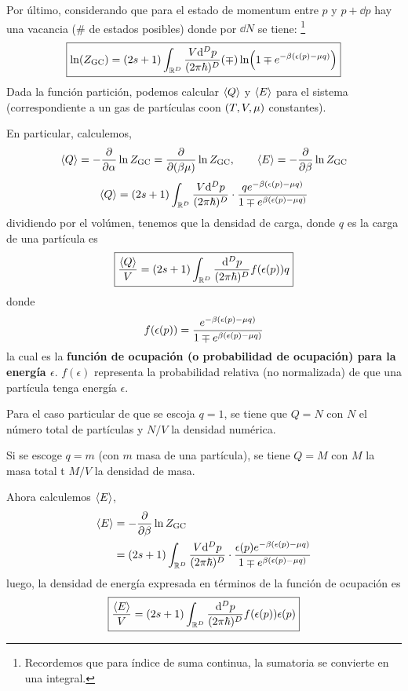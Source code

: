 Por último, considerando que para el estado de momentum entre $p$ y $p+\dd p$ hay una vacancia (\# de estados posibles) donde por $\dd N$ se tiene: \footnote{Recordemos que para índice de suma continua, la sumatoria se convierte en una integral.}
\begin{equation}
 \boxed{ \ln(Z_{\rm GC})=(2s+1)\int_{\mathbb{R}^D}\frac{V\dd^Dp}{(2\pi\hbar)^D}(\mp)\ln(1\mp e^{-\beta (\epsilon(p)-\mu q)})}
\end{equation}
Dada la función partición, podemos calcular $\ev{Q}$ y $\ev{E}$ para el sistema (correspondiente a un gas de partículas coon $(T,V,\mu )$ constantes).

En particular, calculemos,
\begin{equation}
  \ev{Q}=-\pdv{\a }\ln\zgc=\pdv{(\b\m )}\ln\zgc,\qquad \ev{E}=-\pdv{\b}\ln\zgc
\end{equation}
\begin{equation}
  \ev{Q}=(2s+1)\int_{\mathbb{R}^D}\frac{V\dd^Dp}{(2\p\hbar)^D}\cdot \frac{qe^{-\b (\epsilon(p)-\m q)}}{1\mp e^{\b (\epsilon(p)-\m q)}}
\end{equation}
dividiendo por el volúmen, tenemos que la densidad de carga, donde $q$ es la carga de una partícula es
\begin{equation}\label{8.densidadnumerica}
 \boxed{ \frac{\ev{Q}}{V}=(2s+1)\int_{\mathbb{R}^D}\frac{\dd^Dp}{(2\p\hbar)^D}f(\epsilon(p))q}
\end{equation}
donde
\begin{equation}
  f(\epsilon(p))=\frac{e^{-\beta (\epsilon(p)-\mu q)}}{1\mp e^{\beta (\epsilon(p)-\mu q)}}
\end{equation}
la cual es la \textbf{función de ocupación (o probabilidad de ocupación) para la energía $\epsilon$}. $f(\epsilon)$ representa la probabilidad relativa (no normalizada) de que una partícula tenga energía $\epsilon$.

Para el caso particular de que se escoja $q=1$, se tiene que $Q=N$ con $N$ el número total de partículas y $N/V$ la densidad numérica.

Si se escoge $q=m$ (con $m$ masa de una partícula), se tiene $Q=M$ con $M$ la masa total t $M/V$ la densidad de masa.

Ahora calculemos $\ev{E}$,
\begin{align}
  \ev{E}&=-\pdv{\b}\ln\zgc\\
  &=(2s+1)\int_{\mathbb{R}^D}\frac{V\dd^Dp}{(2\p\hbar)^D}\cdot \frac{\epsilon(p)e^{-\b (\epsilon(p)-\m q)}}{1\mp e^{\b (\epsilon(p)-\m q)}}
\end{align}
luego, la densidad de energía expresada en términos de la función de ocupación es
\begin{equation}
  \boxed{\frac{\ev{E}}{V}=(2s+1)\int_{\mathbb{R}^D}\frac{\dd^Dp}{(2\p\hbar)^D}f(\epsilon(p))\epsilon(p)}
\end{equation}

